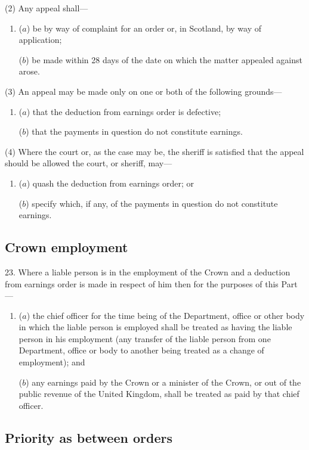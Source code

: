 \documentclass[12pt,a4paper]{article}
\begin{document}
(2) Any appeal shall—
\begin{enumerate}\item[]
($a$) be by way of complaint for an order or, in Scotland, by way of application;

($b$) be made within 28 days of the date on which the matter appealed against arose.
\end{enumerate}

(3) An appeal may be made only on one or both of the following grounds—
\begin{enumerate}\item[]
($a$) that the deduction from earnings order is defective;

($b$) that the payments in question do not constitute earnings.
\end{enumerate}

(4) Where the court or, as the case may be, the sheriff is satisfied that the appeal should be allowed the court, or sheriff, may—
\begin{enumerate}\item[]
($a$) quash the deduction from earnings order; or

($b$) specify which, if any, of the payments in question do not constitute earnings.
\end{enumerate}

\subsection[23. Crown employment]{Crown employment}

23.  Where a liable person is in the employment of the Crown and a deduction from earnings order is made in respect of him then for the purposes of this Part—
\begin{enumerate}\item[]
($a$) the chief officer for the time being of the Department, office or other body in which the liable person is employed shall be treated as having the liable person in his employment (any transfer of the liable person from one Department, office or body to another being treated as a change of employment); and

($b$) any earnings paid by the Crown or a minister of the Crown, or out of the public revenue of the United Kingdom, shall be treated as paid by that chief officer.
\end{enumerate}

\subsection[24. Priority as between orders]{Priority as between orders}
\end{document}
